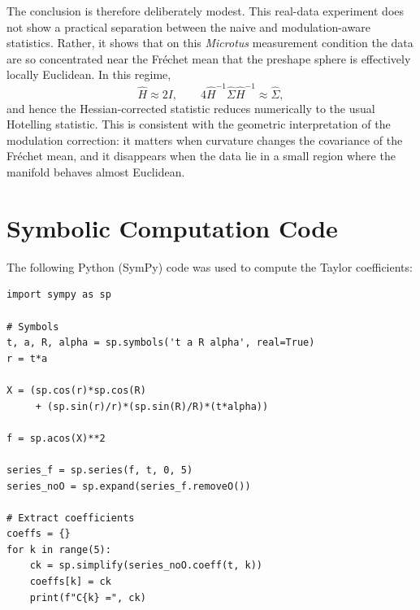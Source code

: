 \documentclass{amsart}
\theoremstyle{definition}
\theoremstyle{remark}
\newcommand\0{\boldsymbol{0}}
\begin{document}
The conclusion is therefore deliberately modest.  This real-data experiment does
not show a practical separation between the naive and modulation-aware
statistics.  Rather, it shows that on this \textit{Microtus} measurement
condition the data are so concentrated near the Fr\'echet mean that the
preshape sphere is effectively locally Euclidean.  In this regime,
\[
\widehat H\approx 2I,
\qquad
4\widehat H^{-1}\widehat\Sigma\widehat H^{-1}\approx\widehat\Sigma,
\]
and hence the Hessian-corrected statistic reduces numerically to the usual
Hotelling statistic.  This is consistent with the geometric interpretation of
the modulation correction: it matters when curvature changes the covariance of
the Fr\'echet mean, and it disappears when the data lie in a small region where
the manifold behaves almost Euclidean.





















\appendix
\section{Symbolic Computation Code}\label{scn:symbolic-computation}

The following Python (SymPy) code was used to compute the Taylor coefficients:

\begin{verbatim}
import sympy as sp

# Symbols
t, a, R, alpha = sp.symbols('t a R alpha', real=True)
r = t*a

X = (sp.cos(r)*sp.cos(R)
     + (sp.sin(r)/r)*(sp.sin(R)/R)*(t*alpha))

f = sp.acos(X)**2

series_f = sp.series(f, t, 0, 5)
series_noO = sp.expand(series_f.removeO())

# Extract coefficients
coeffs = {}
for k in range(5):
    ck = sp.simplify(series_noO.coeff(t, k))
    coeffs[k] = ck
    print(f"C{k} =", ck)
\end{verbatim}





%
%
\end{document}
